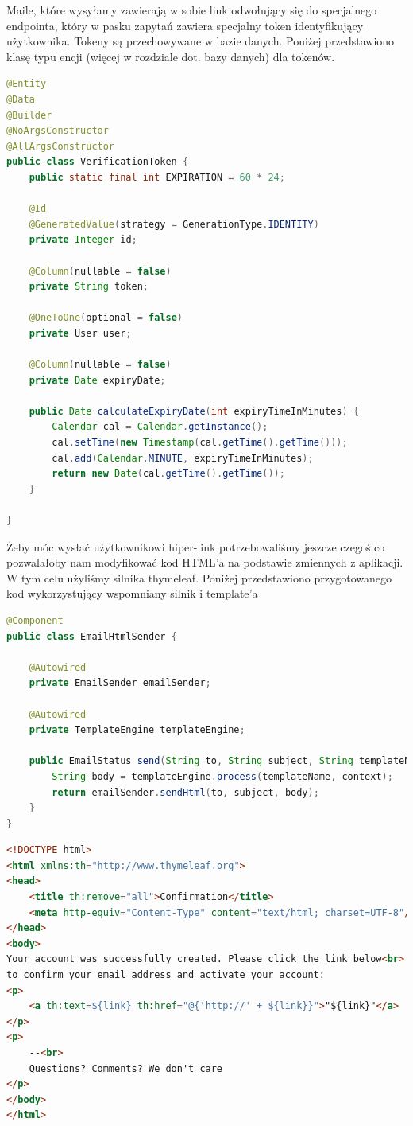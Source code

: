 \documentclass{report}
\begin{document}
Maile, które wysyłamy zawierają w sobie link odwołujący się do specjalnego endpointa, który w pasku zapytań zawiera specjalny token identyfikujący użytkownika. Tokeny są przechowywane w bazie danych. Poniżej przedstawiono klasę typu encji (więcej w rozdziale dot. bazy danych) dla tokenów.


\begin{lstlisting}[language=Java, breaklines]
@Entity
@Data
@Builder
@NoArgsConstructor
@AllArgsConstructor
public class VerificationToken {
    public static final int EXPIRATION = 60 * 24;

    @Id
    @GeneratedValue(strategy = GenerationType.IDENTITY)
    private Integer id;

    @Column(nullable = false)
    private String token;

    @OneToOne(optional = false)
    private User user;

    @Column(nullable = false)
    private Date expiryDate;

    public Date calculateExpiryDate(int expiryTimeInMinutes) {
        Calendar cal = Calendar.getInstance();
        cal.setTime(new Timestamp(cal.getTime().getTime()));
        cal.add(Calendar.MINUTE, expiryTimeInMinutes);
        return new Date(cal.getTime().getTime());
    }

}
\end{lstlisting}

	Żeby móc wysłać użytkownikowi hiper-link potrzebowaliśmy jeszcze czegoś co pozwalałoby nam modyfikować kod HTML'a na podstawie zmiennych z aplikacji. W tym celu użyliśmy silnika thymeleaf. Poniżej przedstawiono przygotowanego kod wykorzystujący wspomniany silnik i template'a

\begin{lstlisting}[language=Java, breaklines]	
@Component
public class EmailHtmlSender {

    @Autowired
    private EmailSender emailSender;

    @Autowired
    private TemplateEngine templateEngine;

    public EmailStatus send(String to, String subject, String templateName, Context context) {
        String body = templateEngine.process(templateName, context);
        return emailSender.sendHtml(to, subject, body);
    }
}
\end{lstlisting}

\begin{lstlisting}[language=HTML, breaklines]
<!DOCTYPE html>
<html xmlns:th="http://www.thymeleaf.org">
<head>
    <title th:remove="all">Confirmation</title>
    <meta http-equiv="Content-Type" content="text/html; charset=UTF-8"/>
</head>
<body>
Your account was successfully created. Please click the link below<br>
to confirm your email address and activate your account:
<p>
    <a th:text=${link} th:href="@{'http://' + ${link}}">"${link}"</a>
</p>
<p>
    --<br>
    Questions? Comments? We don't care
</p>
</body>
</html>
\end{lstlisting}
\end{document}
